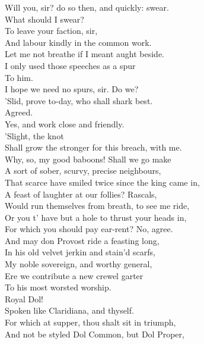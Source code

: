 \documentclass[a4paper,oneside]{memoir}
\begin{document}
\begin{drama*}
\dolspeaks Will you, sir? do so then, and quickly: swear.\\
\subtlespeaks What should I swear?\\
\dolspeaks {} To leave your faction, sir,\\
And labour kindly in the common work.\\
\subtlespeaks Let me not breathe if I meant aught beside.\\
I only used those speeches as a spur\\
To him.\\
\dolspeaks {} I hope we need no spurs, sir. Do we?\\
\facespeaks 'Slid, prove to-day, who shall shark best.\\
\subtlespeaks {} Agreed.\\
\dolspeaks Yes, and work close and friendly.\\
\subtlespeaks {} 'Slight, the knot\\
Shall grow the stronger for this breach, with me.\\
\dolspeaks Why, so, my good baboons! Shall we go make\\
A sort of sober, scurvy, precise neighbours,\\
That scarce have smiled twice since the king came in,\\
A feast of laughter at our follies? Rascals,\\
Would run themselves from breath, to see me ride,\\
Or you t' have but a hole to thrust your heads in,\\
For which you should pay ear-rent? No, agree.\\
And may don Provost ride a feasting long,\\
In his old velvet jerkin and stain'd scarfs,\\
My noble sovereign, and worthy general,\\
Ere we contribute a new crewel garter\\
To his most worsted worship.\\
\subtlespeaks {} Royal Dol!\\
Spoken like Claridiana, and thyself.\\
\facespeaks For which at supper, thou shalt sit in triumph,\\
And not be styled Dol Common, but Dol Proper,\\

\end{drama*}
\end{document}
